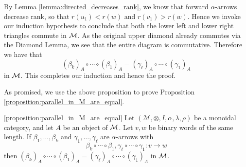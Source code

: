 \begin{prf}
    \begin{center}
    \end{center}
    By Lemma \ref{lemma:directed_decreases_rank}, we know  that forward $\alpha$-arrows 
    decrease rank, so that $r(u_1) < r(w)$ and 
    $r(v_1) > r(w)$. Hence we invoke our induction hypothesis to conclude that 
    both the lower left and lower right triangles commute in $\mathcal{M}$. As the original upper diamond 
    already commutes via the Diamond Lemma, we see that the entire diagram is commutative. 
    Therefore we have that 
    \[
        (\beta_k)_A  \circ \cdots \circ (\beta_1)_A
        = (\gamma_{\ell})_A \circ \cdots \circ (\gamma_{1})_A
    \]
    in $\mathcal{M}$. This completes our induction and hence the proof.
\end{prf}

As promised, we use the above proposition to prove 
Proposition \ref{proposition:parallel_in_M_are_equal}.


\begin{customprop}{\ref{proposition:parallel_in_M_are_equal}}\label{proof:proposition:parallel_in_M_are_equal}
    Let $(\mathcal{M}, \otimes, I, \alpha, \lambda, \rho)$ be a monoidal category, 
    and let $A$ be an object of $\mathcal{M}$. Let $v,w$ be binary words of the same length.
    If $\beta_1, \dots , \beta_k$ and $\gamma_1, \dots , \gamma_{\ell}$ are 
    $\alpha$-arrows with 
    \[
        \beta_k \circ \cdots \circ \beta_1,
        \gamma_{\ell} \circ \cdots \circ \gamma_1: v \to w
    \]
    then $(\beta_k)_A  \circ \cdots \circ (\beta_1)_A
    = (\gamma_{\ell})_A \circ \cdots \circ (\gamma_1)_A$ in $\mathcal{M}$.
\end{customprop}

